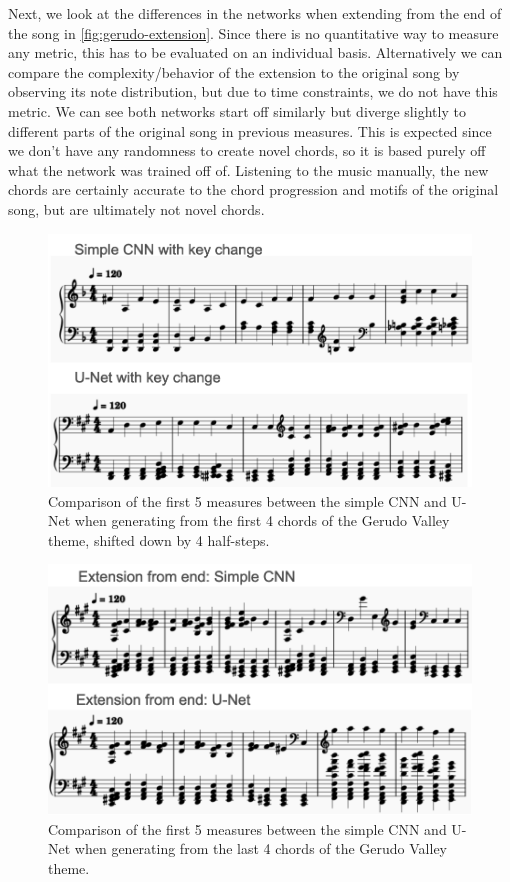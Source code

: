 \documentclass[
	a4paper, %
	10pt, %
	unnumberedsections, %
	twoside, %
]{LTJournalArticle}
\begin{document}
Next, we look at the differences in the networks when extending from the end of the song in \autoref{fig:gerudo-extension}. Since there is no quantitative way to measure any metric, this has to be evaluated on an individual basis. Alternatively we can compare the complexity/behavior of the extension to the original song by observing its note distribution, but due to time constraints, we do not have this metric. We can see both networks start off similarly but diverge slightly to different parts of the original song in previous measures. This is expected since we don't have any randomness to create novel chords, so it is based purely off what the network was trained off of. Listening to the music manually, the new chords are certainly accurate to the chord progression and motifs of the original song, but are ultimately not novel chords.

\begin{figure}
    \centering
    \includegraphics[width=\linewidth]{images/gerudo-keychange.png}
    \caption{Comparison of the first 5 measures between the simple CNN and U-Net when generating from the first 4 chords of the Gerudo Valley theme, shifted down by 4 half-steps.}
    \label{fig:gerudo-keychange}
\end{figure}

\begin{figure}
    \centering
    \includegraphics[width=\linewidth]{images/gerudo-extension.png}
    \caption{Comparison of the first 5 measures between the simple CNN and U-Net when generating from the last 4 chords of the Gerudo Valley theme.}
    \label{fig:gerudo-extension}
\end{figure}
\end{document}
